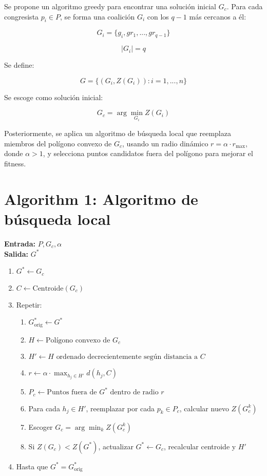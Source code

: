 \documentclass[12pt]{article}
\begin{document}
Se propone un algoritmo greedy para encontrar una solución inicial \( G_c \). Para cada congresista \( p_i \in P \), se forma una coalición \( G_i \) con los \( q-1 \) más cercanos a él:

\begin{equation}
G_i = \{g_i, gr_1, ..., gr_{q-1}\}
\end{equation}

\[
|G_i| = q
\]

Se define:

\begin{equation}
G = \{(G_i, Z(G_i)) : i = 1, ..., n\}
\end{equation}

Se escoge como solución inicial:

\begin{equation}
G_c = \arg\min_{G_i} Z(G_i)
\end{equation}

Posteriormente, se aplica un algoritmo de búsqueda local que reemplaza miembros del polígono convexo de \( G_c \), usando un radio dinámico \( r = \alpha \cdot r_{\text{max}} \), donde \( \alpha > 1 \), y selecciona puntos candidatos fuera del polígono para mejorar el fitness.

\section*{Algorithm 1: Algoritmo de búsqueda local}

\textbf{Entrada:} \( P, G_c, \alpha \) \\
\textbf{Salida:} \( G^* \)

\begin{enumerate}
    \item \( G^* \gets G_c \)
    \item \( C \gets \text{Centroide}(G_c) \)
    \item Repetir:
    \begin{enumerate}
        \item \( G^*_{\text{orig}} \gets G^* \)
        \item \( H \gets \text{Polígono convexo de } G_c \)
        \item \( H' \gets H \text{ ordenado decrecientemente según distancia a } C \)
        \item \( r \gets \alpha \cdot \max_{h_j \in H'} d(h_j, C) \)
        \item \( P_c \gets \text{Puntos fuera de } G^* \text{ dentro de radio } r \)
        \item Para cada \( h_j \in H' \), reemplazar por cada \( p_k \in P_c \), calcular nuevo \( Z(G_c^k) \)
        \item Escoger \( G_c = \arg\min_k Z(G_c^k) \)
        \item Si \( Z(G_c) < Z(G^*) \), actualizar \( G^* \gets G_c \), recalcular centroide y \( H' \)
    \end{enumerate}
    \item Hasta que \( G^* = G^*_{\text{orig}} \)
\end{enumerate}
\end{document}

